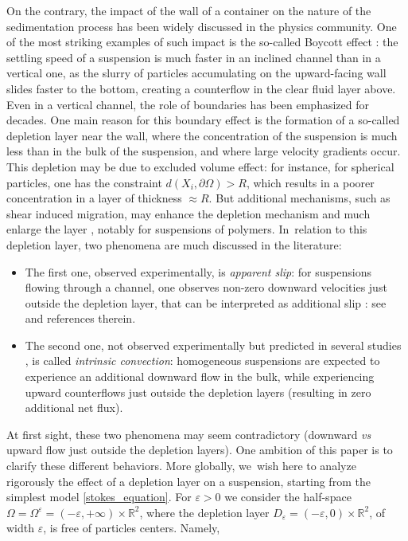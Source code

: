 \documentclass[JEP,XML,SOM,Unicode,NoEqCountersInSection,published]{cedram}
\theoremstyle{plain}
\theoremstyle{definition}
\let\pa\partial
\let\eps\varepsilon
\newcommand{\R}{\mathbb{R}}
\begin{document}
On the contrary, the impact of the wall of a container on the nature of the sedimentation process has been widely discussed in the physics community. One of the most striking examples of such impact is the so-called Boycott effect \cite{Boy20}: the settling speed of a suspension is much faster in an inclined channel than in a vertical one, as the slurry of particles accumulating on the upward-facing wall slides faster to the bottom, creating a counterflow in the clear fluid layer above.
Even in a vertical channel, the role of boundaries has been emphasized for decades. One main reason for this boundary effect is the formation of a so-called depletion layer near the wall, where the concentration of the suspension is much less than in the bulk of the suspension, and where large velocity gradients occur. This depletion may be due to excluded volume effect: for instance, for spherical particles, one has the constraint $d(X_i, \pa \Omega) > R$, which results in a poorer concentration in a layer of thickness $\approx R$. But additional mechanisms, such as shear induced migration, may enhance the depletion mechanism and much enlarge the layer \cite{SegSil,SegSil2,Ho_Leal_1974,Ausserre}, notably for suspensions of polymers. In~relation to this depletion layer, two phenomena are much discussed in the literature:
\begin{itemize}
\item The first one, observed experimentally, is {\em apparent slip}: for suspensions flowing through a channel, one observes non-zero downward velocities just outside the depletion layer, that can be interpreted as additional slip : see \cite{Abbasi,Koponen,Ghosh} and references therein.
\item The second one, not observed experimentally but predicted in several studies \cite{GeiMaz,BFAH96,BFBA98}, is called {\em intrinsic convection}: homogeneous suspensions are expected to experience an additional downward flow in the bulk, while experiencing upward counterflows just outside the depletion layers (resulting in zero additional net flux).
\end{itemize}
At first sight, these two phenomena may seem contradictory (downward {\it vs} upward flow just outside the depletion layers). One ambition of this paper is to clarify these different behaviors. More globally, we~wish here to analyze rigorously the effect of a depletion layer on a suspension, starting from the simplest model \eqref{stokes_equation}. For $\eps > 0$ we consider the half-space $\Omega = \Omega^\eps = (-\eps,+\infty) \times \R^2$, where the depletion layer $D_\eps = (-\eps,0) \times \R^2$, of width $\eps$, is free of particles centers. Namely,
\end{document}
